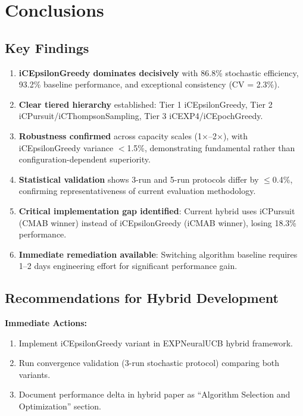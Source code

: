 \documentclass[12pt,a4paper]{article}
\newcommand{\primarytext}[1]{\textcolor{primaryblue}{\textbf{#1}}}
\newcommand{\secondarytext}[1]{\textcolor{secondaryblue}{\textbf{#1}}}
\newcommand{\success}[1]{\textcolor{accentgreen}{\textbf{#1}}}
\newcommand{\warning}[1]{\textcolor{warningred}{\textbf{#1}}}
\begin{document}
\newpage
\section{Conclusions}

\subsection{Key Findings}
\begin{enumerate}
\item \primarytext{iCEpsilonGreedy dominates decisively} with 86.8\% stochastic efficiency, 93.2\% baseline performance, and exceptional consistency (CV = 2.3\%).
\item \secondarytext{Clear tiered hierarchy} established: Tier 1 iCEpsilonGreedy, Tier 2 iCPursuit/iCThompsonSampling, Tier 3 iCEXP4/iCEpochGreedy.
\item \success{Robustness confirmed} across capacity scales (1$\times$--2$\times$), with iCEpsilonGreedy variance $<$1.5\%, demonstrating fundamental rather than configuration-dependent superiority.
\item \success{Statistical validation} shows 3-run and 5-run protocols differ by $\leq$0.4\%, confirming representativeness of current evaluation methodology.
\item \warning{Critical implementation gap identified}: Current hybrid uses iCPursuit (CMAB winner) instead of iCEpsilonGreedy (iCMAB winner), losing 18.3\% performance.
\item \success{Immediate remediation available}: Switching algorithm baseline requires 1--2 days engineering effort for significant performance gain.
\end{enumerate}

\subsection{Recommendations for Hybrid Development}

\textbf{Immediate Actions:}
\begin{enumerate}
\item Implement iCEpsilonGreedy variant in EXPNeuralUCB hybrid framework.
\item Run convergence validation (3-run stochastic protocol) comparing both variants.
\item Document performance delta in hybrid paper as ``Algorithm Selection and Optimization'' section.
\end{enumerate}
\end{document}
